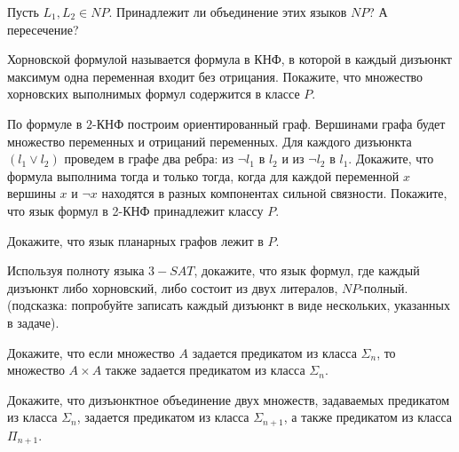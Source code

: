 \setcounter{curtask}{25}


\begin{task}
    Пусть $L_1, L_2 \in NP$. Принадлежит ли объединение этих языков $NP$? А пересечение?
\end{task}

\begin{task}
    Хорновской формулой называется формула в КНФ, в которой в каждый дизъюнкт
    максимум одна переменная входит без отрицания. Покажите, что множество
    хорновских выполнимых формул содержится в классе $P$.
\end{task}

\begin{task}
    По формуле в $2$-КНФ построим ориентированный граф. Вершинами графа будет
    множество переменных и отрицаний переменных. Для каждого дизъюнкта $(l_1 \lor
    l_2)$ проведем в графе два ребра: из $\neg l_1$ в $l_2$ и из $\neg l_2$ в
    $l_1$. Докажите, что формула выполнима тогда и только тогда, когда для каждой
    переменной $x$ вершины $x$ и $\neg x$ находятся в разных компонентах сильной
    связности. Покажите, что язык формул в 2-КНФ принадлежит классу $P$.
\end{task}


\begin{task}
    Докажите, что язык планарных графов лежит в $P$.
\end{task}

\begin{task}
	Используя полноту языка $3-SAT$, докажите, что язык формул, где каждый дизъюнкт либо
    хорновский, либо состоит из двух литералов, $NP$-полный. (подсказка: попробуйте
    записать каждый дизъюнкт в виде нескольких, указанных в задаче).
\end{task}



\breakline


\begin{ptask}{23}
    Докажите, что если множество $A$ задается предикатом из класса $\Sigma_n$, то
    множество $A \times A$ также задается предикатом из класса $\Sigma_n$.
\end{ptask}

\begin{ptask}{24}
    Докажите, что дизъюнктное объединение двух множеств, задаваемых предикатом из
    класса $\Sigma_n$, задается предикатом из класса $\Sigma_{n + 1}$, а также
    предикатом из класса $\Pi_{n + 1}$.
\end{ptask}
